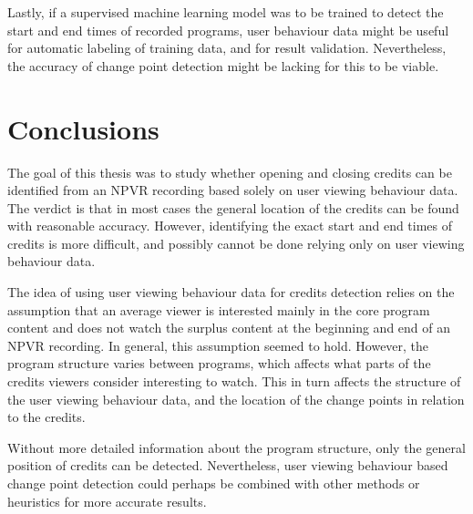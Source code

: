 Lastly, if a supervised machine learning model was to be trained to detect the start and end times of recorded programs, user behaviour data might be useful for automatic labeling of training data, and for result validation. Nevertheless, the accuracy of change point detection might be lacking for this to be viable.

\newpage
\section{Conclusions} \label{sec:conclusions} %


The goal of this thesis was to study whether opening and closing credits can be identified from an NPVR recording based solely on user viewing behaviour data. The verdict is that in most cases the general location of the credits can be found with reasonable accuracy. However, identifying the exact start and end times of credits is more difficult, and possibly cannot be done relying only on user viewing behaviour data.


The idea of using user viewing behaviour data for credits detection relies on the assumption that an average viewer is interested mainly in the core program content and does not watch the surplus content at the beginning and end of an NPVR recording. In general, this assumption seemed to hold. However, the program structure varies between programs, which affects what parts of the credits viewers consider interesting to watch. This in turn affects the structure of the user viewing behaviour data, and the location of the change points in relation to the credits.

Without more detailed information about the program structure, only the general position of credits can be detected. Nevertheless, user viewing behaviour based change point detection could perhaps be combined with other methods or heuristics for more accurate results.

